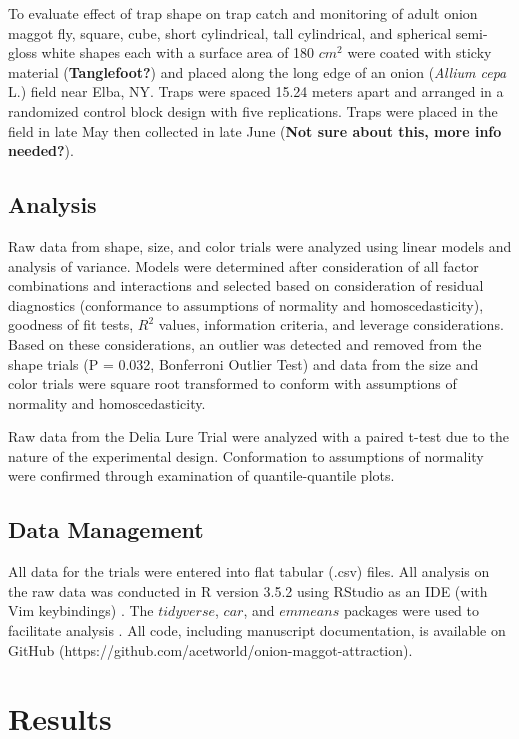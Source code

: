 \documentclass[alpha-refs]{wiley-article}
\begin{document}
To evaluate effect of trap shape on trap catch and monitoring of adult onion maggot fly, square, cube, short cylindrical, tall cylindrical, and spherical semi-gloss white shapes each with a surface area of 180 $cm^2$  were coated with sticky material (\textbf{Tanglefoot?}) and placed along the long edge of an onion (\textit{Allium cepa} L.) field near Elba, NY.  Traps were spaced 15.24 meters apart and arranged in a randomized control block design with five replications.  Traps were placed in the field in late May then collected in late June (\textbf{Not sure about this, more info needed?}).   

\subsection{Analysis}

Raw data from shape, size, and color trials were analyzed using linear models and analysis of variance.  Models were determined after consideration of all factor combinations and interactions and selected based on consideration of residual diagnostics (conformance to assumptions of normality and homoscedasticity), goodness of fit tests, $R^2$ values, information criteria, and leverage considerations. Based on these considerations, an outlier was detected and removed from the shape trials (P = 0.032, Bonferroni Outlier Test) and data from the size and color trials were square root transformed to conform with assumptions of normality and homoscedasticity.    

Raw data from the Delia Lure Trial were analyzed with a paired t-test due to the nature of the experimental design.  Conformation to assumptions of normality were confirmed through examination of quantile-quantile plots.

\subsection{Data Management}

All data for the trials were entered into flat tabular (.csv) files.  All analysis on the raw data was conducted in R version 3.5.2 using RStudio as an IDE (with Vim keybindings) \citep{rcore2018,rstudio}.  The $tidyverse$, $car$, and $emmeans$ packages were used to facilitate analysis \citep{tidy, car, emmeans}.  All code, including manuscript documentation, is available on GitHub (https://github.com/acetworld/onion-maggot-attraction).

\section{Results}
\end{document}
